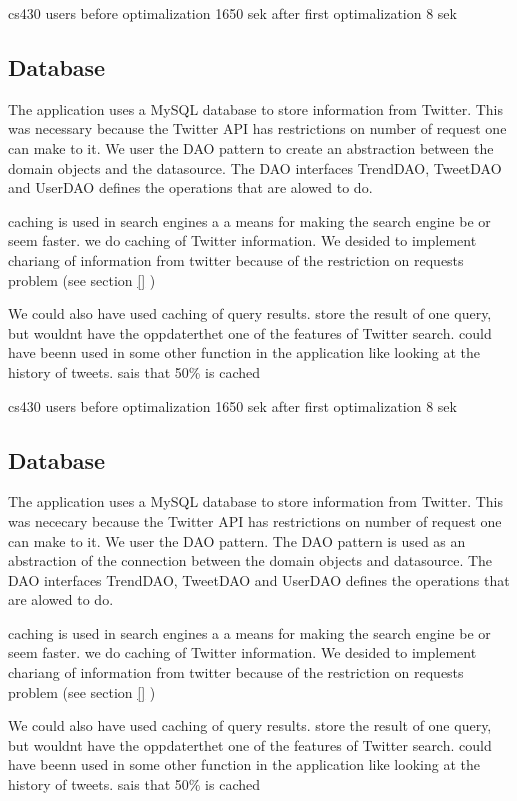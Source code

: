 cs430 users 
before optimalization
1650 sek
after first optimalization
8 sek

\subsection{Database} %
\label{feedJamDatabase}
The application uses a MySQL database to store information from Twitter. This was necessary because the Twitter API has restrictions on number of request one can make to it.
We user the DAO pattern to create an abstraction between the domain objects and the datasource.  The DAO interfaces TrendDAO, TweetDAO and UserDAO defines the operations that are alowed to do.  


\citep{boka kap11} caching is used in search engines a a means for making the search engine be or seem faster. we do caching of Twitter information. We desided to implement chariang of information from twitter because of the restriction on requests problem (see section \ref{} \nameref{}) 

We could also have used caching of query results. store the result of one query, but wouldnt have the oppdaterthet %
one of the features of Twitter search. could have beenn used in some other function in the application like looking at the history of tweets. \citet{boka kap 11, under caching} sais that 50\% is cached


cs430 users 
before optimalization
1650 sek
after first optimalization
8 sek

\subsection{Database} %
\label{feedJamDatabase}
The application uses a MySQL database to store information from Twitter. This was nececary because the Twitter API has restrictions on number of request one can make to it.
We user the DAO pattern. The DAO pattern is used as an abstraction of the connection between the domain objects and datasource. The DAO interfaces TrendDAO, TweetDAO and UserDAO defines the operations that are alowed to do.  


\citep{boka kap11} caching is used in search engines a a means for making the search engine be or seem faster. we do caching of Twitter information. We desided to implement chariang of information from twitter because of the restriction on requests problem (see section \ref{} \nameref{}) 

We could also have used caching of query results. store the result of one query, but wouldnt have the oppdaterthet %
one of the features of Twitter search. could have beenn used in some other function in the application like looking at the history of tweets. \citet{boka kap 11, under caching} sais that 50\% is cached




